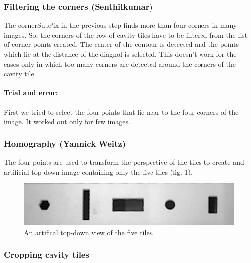\documentclass{article}
\begin{document}
\subsubsection*{Filtering the corners (Senthilkumar)}
The cornerSubPix in the previous step finds more than four corners in many images. So, the corners of the row of cavity tiles have to be filtered from the list of corner points created. The center of the contour is detected and the points which lie at the distance of the diagnol is selected. This doesn't work for the cases only in which too many corners are detected around the corners of the cavity tile.
\paragraph*{Trial and error:}
First we tried to select the four points that lie near to the four corners of the image. It worked out only for few images. 
\subsubsection*{Homography (Yannick Weitz)}
The four points are used to transform the perspective of the tiles to create and artificial top-down image containing only the five tiles (fig. \ref{fig:homograph}).\\
\begin{figure}[h!]
\centering
\includegraphics[scale=0.3]{images/homography.jpg}
\caption{An artifical top-down view of the five tiles.}
\label{fig:homograph}
\end{figure}

\subsubsection*{Cropping cavity tiles}
\end{document}
